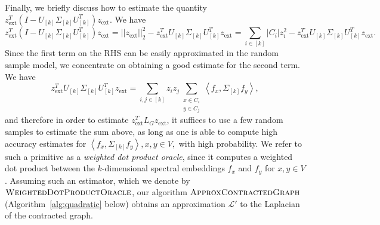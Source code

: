\documentclass[letterpaper,11pt]{article}
\newcommand{\zext}{z_{\text{ext}}}
\theoremstyle{plain}
\theoremstyle{definition}
\theoremstyle{remark}
\newcommand{\rdp}[1]
  {\ensuremath{\left\langle #1 \right\rangle}}
\begin{document}
Finally, we briefly discuss how to estimate the quantity $\zext^T(I - U_{[k]}\Sigma_{[k]} U_{[k]}^T)\zext$. We have
$$
\zext^T(I - U_{[k]}\Sigma_{[k]} U_{[k]}^T)\zext=||\zext||_2^2- \zext^TU_{[k]}\Sigma_{[k]} U_{[k]}^T\zext= \sum_{i\in [k]} |C_i| z_i^2- \zext^TU_{[k]}\Sigma_{[k]} U_{[k]}^T\zext.
$$
Since the first term on the RHS can be easily approximated in the random sample model, we concentrate on obtaining a good estimate for the second term. We have
\begin{equation}
	\zext^T U_{[k]} \Sigma_{[k]} U_{[k]}^T \zext = \sum_{i,j \in [k]} z_i z_j \sum_{\substack{x \in C_i\\y \in C_j}} \rdp{f_x, \Sigma_{[k]} f_y},
\end{equation}
and therefore in order to estimate $\zext^T  L_G \zext$, it suffices to use a few random samples to estimate the sum above, as long as one is able to compute high accuracy estimates for  $\rdp{f_x, \Sigma_{[k]} f_y}, x, y\in V,$ with high probability. We refer to such a primitive as a {\em weighted dot product oracle}, since it computes a weighted dot product between the $k$-dimensional spectral embeddings $f_x$ 
 and $f_y$ for $x,y\in V$. Assuming such an estimator, which we denote by $\textsc{WeightedDotProductOracle}$, our algorithm $\textsc{ApproxContractedGraph}$ (Algorithm~\ref{alg:quadratic} below) obtains an approximation $\mathcal{L}'$ to the Laplacian of the contracted graph.  \\
\vspace{-10pt}
\end{document}
